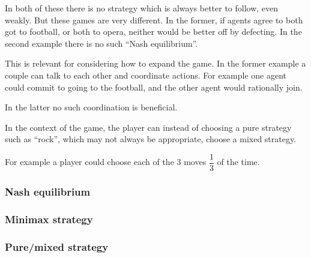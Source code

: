In both of these there is no strategy which is always better to follow, even weakly. But these games are very different. In the former, if agents agree to both got to football, or both to opera, neither would be better off by defecting. In the second example there is no such “Nash equilibrium”.

This is relevant for considering how to expand the game. In the former example a couple can talk to each other and coordinate actions.  For example one agent could commit to going to the football, and the other agent would rationally join.

In the latter no such coordination is beneficial.

In the context of the game, the player can instead of choosing a pure strategy such as “rock”, which may not always be appropriate, choose a mixed strategy.

For example a player could choose each of the \(3\) moves \(\dfrac{1}{3}\) of the time.


\subsubsection{Nash equilibrium}


\subsubsection{Minimax strategy}

\subsubsection{Pure/mixed strategy}

